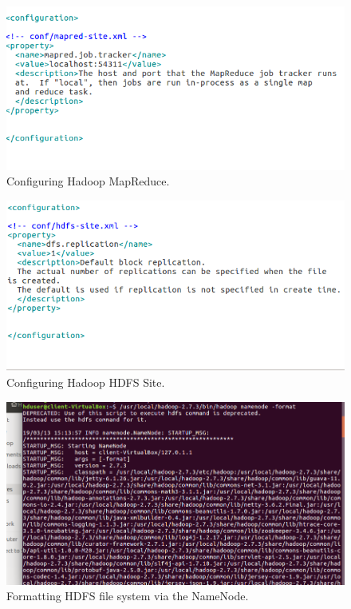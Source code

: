 \documentclass[a4paper,10pt]{article}
\begin{document}
	\begin{figure}[h]
		\includegraphics[scale=0.30,center]{exptTwoScreenShot/fig8.png}
		\caption{Configuring Hadoop MapReduce.}
		\label{fig:8}
	\end{figure}
	
	\begin{figure}[h]
		\includegraphics[scale=0.30,center]{exptTwoScreenShot/fig9.png}
		\caption{Configuring Hadoop HDFS Site.}
		\label{fig:9}
	\end{figure}

\pagebreak

	\begin{figure}[h]
		\includegraphics[scale=0.30,center]{exptTwoScreenShot/fig10.png}
		\caption{Formatting HDFS file system via the NameNode.}
		\label{fig:10}
	\end{figure}
  \pagebreak
  
\end{document}
